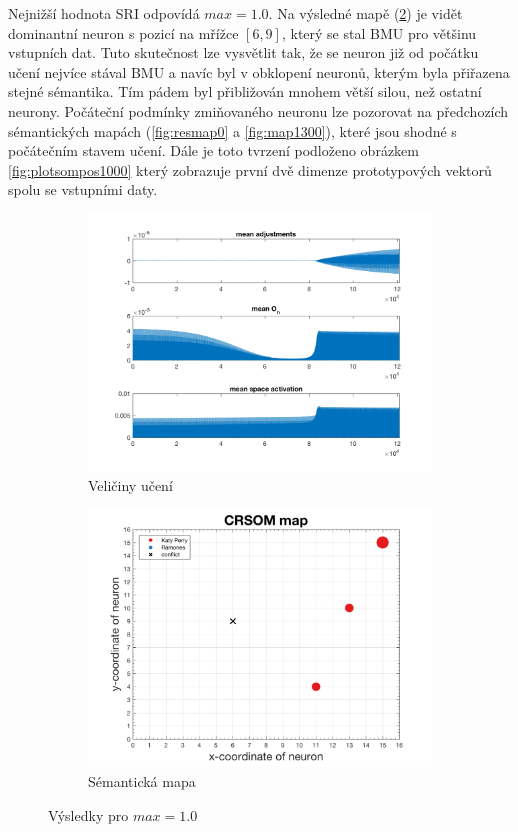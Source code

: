 \documentclass[thesis=M,czech]{FITthesis}[2012/06/26]
\begin{document}
Nejnižší hodnota SRI odpovídá $max=1.0$. Na výsledné mapě (\ref{fig:map1000}) je vidět dominantní neuron s pozicí na mřížce $[6,9]$, který se stal BMU pro většinu vstupních dat. Tuto skutečnost lze vysvětlit tak, že se neuron již od počátku učení nejvíce stával BMU a navíc byl v obklopení neuronů, kterým byla přiřazena stejné sémantika. Tím pádem byl přibližován mnohem větší silou, než ostatní neurony. Počáteční podmínky zmiňovaného neuronu lze pozorovat na předchozích sémantických mapách (\ref{fig:resmap0} a \ref{fig:map1300}), které jsou shodné s počátečním stavem učení. Dále je toto tvrzení podloženo obrázkem \ref{fig:plotsompos1000} který zobrazuje první dvě dimenze prototypových vektorů spolu se vstupními daty.

\begin{figure}
\centering
\begin{subfigure}{.5\textwidth}
  \centering
  \includegraphics[width=.99\linewidth]{norm-learnattrs1000.png}
  \caption{Veličiny učení}
  \label{fig:attrs1000}
\end{subfigure}%
\begin{subfigure}{.5\textwidth}
  \centering
  \includegraphics[width=.99\linewidth]{exp_kp_ram_1000_crsom.png}
  \caption{Sémantická mapa}
  \label{fig:map1000}
\end{subfigure}
\caption{Výsledky pro $max=1.0$}
\label{fig:res1000}
\end{figure}
\end{document}
